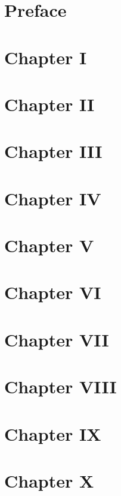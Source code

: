 \documentclass[fontsize=12pt,a5paper,BCOR=12mm,DIV=calc,twoside]{scrbook}
\begin{document}
    
    

\mainmatter
{} 
    \chapter*{Preface}
    
    \chapter*{Chapter I}
    
    \chapter*{Chapter II}
    
    \chapter*{Chapter III}
    
    \chapter*{Chapter IV}
    
    \chapter*{Chapter V}
    
    \chapter*{Chapter VI}
    
    \chapter*{Chapter VII}
    
    \chapter*{Chapter VIII}
    
    \chapter*{Chapter IX}
    
     \chapter*{Chapter X}
    
\end{document}
